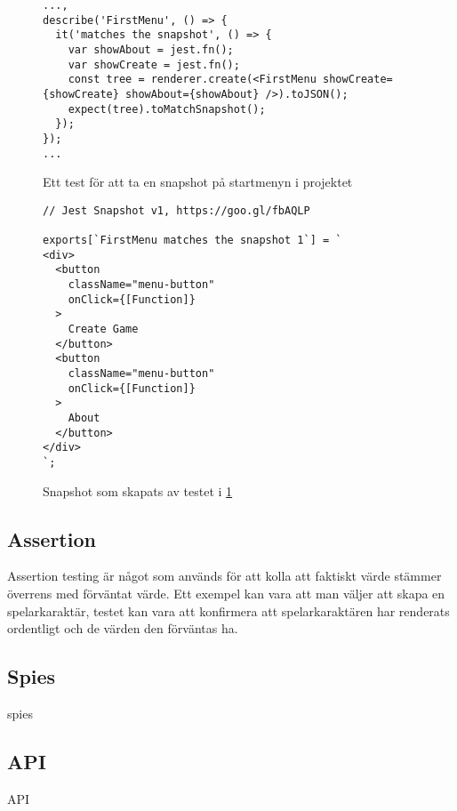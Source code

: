\lstset{language=JavaScript}
\begin{figure}[h]
  \center
  \begin{minipage}[c]{5cm}
    \begin{lstlisting}
...,
describe('FirstMenu', () => {
  it('matches the snapshot', () => {
    var showAbout = jest.fn();
    var showCreate = jest.fn();
    const tree = renderer.create(<FirstMenu showCreate={showCreate} showAbout={showAbout} />).toJSON();
    expect(tree).toMatchSnapshot();
  });
});
...
    \end{lstlisting}
  \end{minipage}

  \caption{Ett test för att ta en snapshot på startmenyn i projektet}
  \label{fig:snapshot-test}
\end{figure}


\lstset{language=Java}
\begin{figure}[h]
  \center
  \begin{minipage}[c]{5cm}
    \begin{lstlisting}
// Jest Snapshot v1, https://goo.gl/fbAQLP

exports[`FirstMenu matches the snapshot 1`] = `
<div>
  <button
    className="menu-button"
    onClick={[Function]}
  >
    Create Game
  </button>
  <button
    className="menu-button"
    onClick={[Function]}
  >
    About
  </button>
</div>
`;

    \end{lstlisting}
  \end{minipage}

  \caption{Snapshot som skapats av testet i \ref{fig:snapshot-test}}
  \label{fig:snapshot-shot}
\end{figure}

\subsection{Assertion}
Assertion testing är något som används för att kolla att faktiskt värde stämmer överrens med förväntat värde. Ett exempel kan vara att man väljer att skapa en spelarkaraktär, testet kan vara att konfirmera att spelarkaraktären har renderats ordentligt och de värden den förväntas ha. 
\subsection{Spies}
spies
\subsection{API}
API
